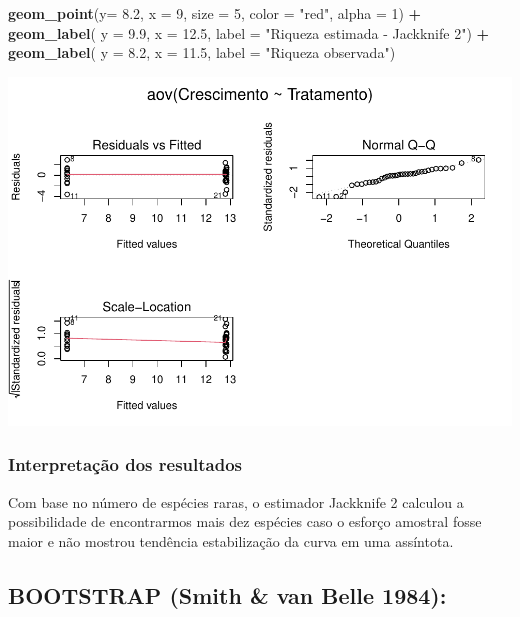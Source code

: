 \documentclass[
]{book}
\newenvironment{Shaded}{\begin{snugshade}}{\end{snugshade}}
\newcommand{\DataTypeTok}[1]{\textcolor[rgb]{0.13,0.29,0.53}{#1}}
\newcommand{\DecValTok}[1]{\textcolor[rgb]{0.00,0.00,0.81}{#1}}
\newcommand{\FloatTok}[1]{\textcolor[rgb]{0.00,0.00,0.81}{#1}}
\newcommand{\KeywordTok}[1]{\textcolor[rgb]{0.13,0.29,0.53}{\textbf{#1}}}
\newcommand{\NormalTok}[1]{#1}
\newcommand{\OperatorTok}[1]{\textcolor[rgb]{0.81,0.36,0.00}{\textbf{#1}}}
\newcommand{\StringTok}[1]{\textcolor[rgb]{0.31,0.60,0.02}{#1}}
\begin{document}
\begin{Shaded}
\begin{Highlighting}[]
\StringTok{  }\KeywordTok{geom_point}\NormalTok{(}\DataTypeTok{y=} \FloatTok{8.2}\NormalTok{, }\DataTypeTok{x =} \DecValTok{9}\NormalTok{, }\DataTypeTok{size =} \DecValTok{5}\NormalTok{, }\DataTypeTok{color =} \StringTok{"red"}\NormalTok{, }\DataTypeTok{alpha =} \DecValTok{1}\NormalTok{) }\OperatorTok{+}\StringTok{ }
\StringTok{  }\KeywordTok{geom_label}\NormalTok{( }\DataTypeTok{y =} \FloatTok{9.9}\NormalTok{, }\DataTypeTok{x =} \FloatTok{12.5}\NormalTok{, }\DataTypeTok{label =} \StringTok{"Riqueza estimada - Jackknife 2"}\NormalTok{) }\OperatorTok{+}
\StringTok{  }\KeywordTok{geom_label}\NormalTok{( }\DataTypeTok{y =} \FloatTok{8.2}\NormalTok{, }\DataTypeTok{x =} \FloatTok{11.5}\NormalTok{, }\DataTypeTok{label =} \StringTok{"Riqueza observada"}\NormalTok{)}
\end{Highlighting}
\end{Shaded}

\includegraphics{livro_r_ecologia_files/figure-latex/unnamed-chunk-13-1.pdf}

\hypertarget{interpretauxe7uxe3o-dos-resultados-6}{%
\subsubsection{Interpretação dos resultados}\label{interpretauxe7uxe3o-dos-resultados-6}}

Com base no número de espécies raras, o estimador Jackknife 2 calculou a possibilidade de encontrarmos mais dez espécies caso o esforço amostral fosse maior e não mostrou tendência estabilização da curva em uma assíntota.

\hypertarget{bootstrap-smith-van-belle-1984}{%
\subsection{BOOTSTRAP (Smith \& van Belle 1984):}\label{bootstrap-smith-van-belle-1984}}
\end{document}
